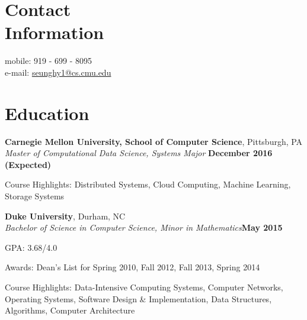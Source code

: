 \documentclass[10pt,margin,line]{resume}
\begin{document}
\begin{resume}

\section{\mysidestyle Contact\\Information}
mobile: 919 - 699 - 8095          		\vspace{0mm}\\\vspace{0mm}%
e-mail: \href{mailto:seunghy1@cs.cmu.edu}{seunghy1@cs.cmu.edu}	\vspace{0mm}\\\vspace{-4.5mm}%

\section{\mysidestyle Education}
\textbf{Carnegie Mellon University, School of Computer Science}, Pittsburgh, PA \\\vspace{0mm}%
\textsl{Master of Computational Data Science, Systems Major} \hfill \textbf{December 2016 (Expected)}
\vspace{-3mm}\\\vspace{-1mm}%
\begin{list3}
    \item Course Highlights: Distributed Systems, Cloud Computing, Machine Learning, Storage Systems
\end{list3}

\textbf{Duke University}, Durham, NC \vspace{0mm}\\\vspace{0mm}%
\textsl{Bachelor of Science in Computer Science, Minor in Mathematics}\hfill \textbf{May 2015}
\vspace{-3mm}\\\vspace{-1mm}%
\begin{list3}
    \item GPA: 3.68/4.0
    \item Awards: Dean's List for Spring 2010, Fall 2012, Fall 2013, Spring 2014
    \item Course Highlights: Data-Intensive Computing Systems, Computer Networks, Operating Systems, Software Design \& Implementation, Data Structures, Algorithms, Computer Architecture
\end{list3}


\end{resume}
\end{document}

